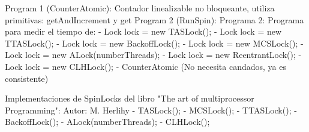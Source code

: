 Program 1 (CounterAtomic): Contador linealizable no bloqueante, utiliza primitivas: getAndIncrement y get
Program 2 (RunSpin): Programa 2: Programa para medir el tiempo de: 
    -		Lock lock = new TASLock();
    -		Lock lock = new TTASLock();
    -		Lock lock = new BackoffLock();
    -		Lock lock = new MCSLock();
    -		Lock lock = new ALock(numberThreads);
    -		Lock lock = new ReentrantLock();
    -		Lock lock = new CLHLock();
    -		CounterAtomic (No necesita candados, ya es consistente)

    Implementaciones de SpinLocks del libro "The art of multiprocessor Programming":
    Autor: M. Herlihy 
    -   TASLock();
    -	MCSLock();
    -	TTASLock();
    -	BackoffLock();
    -	ALock(numberThreads);
    -	CLHLock();